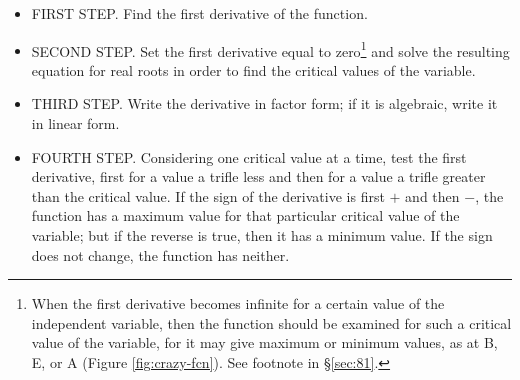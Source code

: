 \begin{itemize}
\item
FIRST STEP. Find the first derivative of the function.

\item
SECOND STEP. Set the first derivative equal to 
zero\footnote{When the first derivative becomes infinite for a 
certain value of the independent variable, then the function 
should be examined for such a critical value of the variable, for 
it may give maximum or minimum values, as at B, E, or A 
(Figure \ref{fig:crazy-fcn}). %
See footnote in \S \ref{sec:81}.} %
and solve the resulting equation for real roots in order to 
find the critical values of the variable.

\item
THIRD STEP. Write the derivative in factor form; if it is algebraic, 
write it in linear form.

\item
FOURTH STEP. Considering one critical value at a time, test the first 
derivative, first for a value a trifle less and then for a value a 
trifle greater than the critical value. If the sign of the 
derivative is first $+$ and then $-$, the function has a maximum value 
for that particular critical value of the variable; but if the 
reverse is true, then it has a minimum value. If the sign does 
not change, the function has neither.
\end{itemize}


